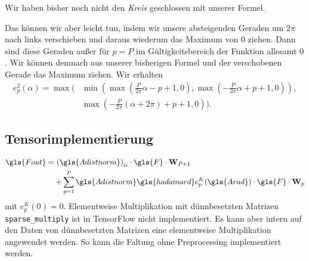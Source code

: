 Wir haben bisher noch nicht den \emph{Kreis} geschlossen mit unserer Formel.

Das können wir aber leicht tun, indem wir unsere absteigenden Geraden um $2\pi$ nach links verschieben und daraus wiederum das Maximum von $0$ ziehen.
Dann sind diese Geraden außer für $p = P$ im Gültigkeitsbereich der Funktion allesamt $0$.
Wir können demnach aus unserer bisherigen Formel und der verschobenen Gerade das Maximum ziehen.
Wir erhalten
\begin{equation}
\begin{split}
  e_p^2\left(\alpha\right) = \max \biggr( & \min \left( \max\left(\frac{P}{2\pi} \alpha - p + 1, 0\right), \max\left(-\frac{P}{2\pi} \alpha + p + 1, 0\right) \right),\\
  & \max \left(-\frac{P}{2\pi} \left( \alpha + 2\pi \right) + p + 1, 0\right) \biggr)\text{.}
\end{split}
\end{equation}

\subsection{Tensorimplementierung}

\begin{equation}
\begin{split}
  \gls{Fout} = & \ {\left(\gls{Adistnorm}\right)}_{ii} \cdot \gls{F} \cdot \ma{W}_{P+1}\\
  & + \sum_{p=1}^P \gls{Adistnorm} \gls{hadamard} e^K_p\left(\gls{Arad}\right) \cdot \gls{F} \cdot \ma{W}_{p}
\end{split}
\end{equation}
mit $e_p^K(0) = 0$.
Elementweise Multiplikation mit dünnbesetzten Matrizen \texttt{sparse\_multiply} ist in TensorFlow nicht implementiert.
Es kann aber intern auf den Daten von dünnbesetzten Matrizen eine elementweise Multiplikation angewendet werden.
So kann die Faltung ohne Preprocessing implementiert werden.


\newpage
